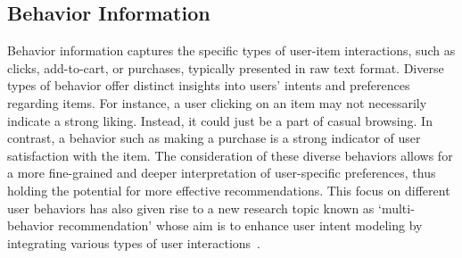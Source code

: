 \documentclass[lettersize,journal]{IEEEtran}
\begin{document}


\subsection{Behavior Information}
{Behavior} information captures the specific types of user-item interactions, such as clicks, add-to-cart, or purchases, typically presented in raw text format. Diverse types of behavior offer distinct insights into users' intents and preferences regarding items. For instance, a user clicking on an item may not necessarily indicate a strong liking. Instead, it could just be a part of casual browsing. In contrast, a behavior such as making a purchase is a strong indicator of user satisfaction with the item. The consideration of these diverse behaviors allows for a more fine-grained and deeper interpretation of user-specific preferences, thus holding the potential for more effective recommendations. This focus on different user behaviors has also given rise to a new research topic known as `multi-behavior recommendation' whose aim is to enhance user intent modeling by integrating various types of user interactions~\cite{Li@WSDM2024,Yan@SIGIR2024, Guo@TKDE2025}.

\end{document}
